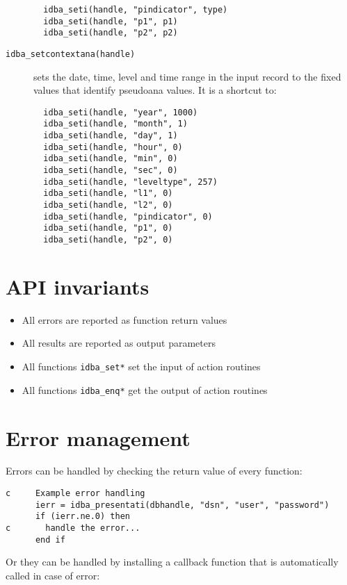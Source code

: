 \documentclass[final,12pt,a4paper,twoside]{book}
\begin{document}
\begin{description}
\begin{verbatim}
  idba_seti(handle, "pindicator", type)
  idba_seti(handle, "p1", p1)
  idba_seti(handle, "p2", p2)
  \end{verbatim}
\item[{\tt idba\_setcontextana(handle)}]
  sets the date, time, level and time range in the input record to the fixed
  values that identify pseudoana values.  It is a shortcut to:
  \begin{verbatim}
  idba_seti(handle, "year", 1000)
  idba_seti(handle, "month", 1)
  idba_seti(handle, "day", 1)
  idba_seti(handle, "hour", 0)
  idba_seti(handle, "min", 0)
  idba_seti(handle, "sec", 0)
  idba_seti(handle, "leveltype", 257)
  idba_seti(handle, "l1", 0)
  idba_seti(handle, "l2", 0)
  idba_seti(handle, "pindicator", 0)
  idba_seti(handle, "p1", 0)
  idba_seti(handle, "p2", 0)
  \end{verbatim}
\end{description}

\section {API invariants}

\label{fun-error}

\begin{itemize}
\item All errors are reported as function return values
\item All results are reported as output parameters
\item All functions {\tt idba\_set*} set the input of action routines
\item All functions {\tt idba\_enq*} get the output of action routines
\end{itemize}

\section {Error management}

Errors can be handled by checking the return value of every function:

\begin{verbatim}
c     Example error handling
      ierr = idba_presentati(dbhandle, "dsn", "user", "password")
      if (ierr.ne.0) then
c       handle the error...
      end if
\end{verbatim}

Or they can be handled by installing a callback function that is automatically
called in case of error:
\end{document}
